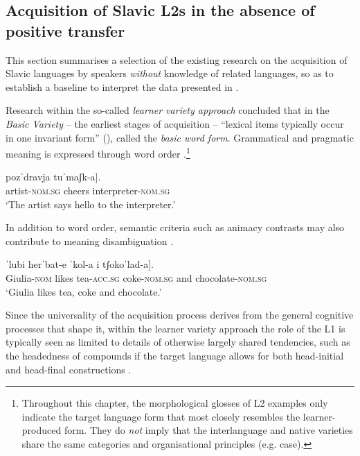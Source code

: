 \documentclass[output=paper,            colorlinks, citecolor=brown            		  ]{langscibook}
\begin{document}
\subsection{Acquisition of Slavic L2s in the absence of positive transfer}
\label{sec:saturno:2.3}
This section summarises a selection of the existing research on the acquisition of Slavic languages by speakers \textit{without} knowledge of related languages, so as to establish a baseline to interpret the data presented in .

Research within the so-called \textit{learner variety approach} \citep{Perdue1993book} concluded that in the \textit{Basic Variety} -- the earliest stages of acquisition -- “lexical items typically occur in one invariant form” (\citealt[311]{KleinPerdue1997}), called the \textit{basic word form}. Grammatical and pragmatic meaning is expressed through word order .\footnote{Throughout this chapter, the morphological glosses of L2 examples only indicate the target language form that most closely resembles the learner-produced form. They do {\textit{not}} imply that the interlanguage and native varieties share the same categories and organisational principles (e.g. case).}

\ea\label{ex:saturno:6}  
\gll {[Arˈtisk-a}     pozˈdravja   {tuˈmaʃk-a]}.\\
artist-\textsc{nom.sg}   cheers   interpreter-\textsc{nom.sg}\\ 
\glt ‘The artist says hello to the interpreter.’
\z

In addition to word order, semantic criteria such as animacy contrasts may also contribute to meaning disambiguation . 

\ea\label{ex:saturno:7}  
\gll {[ˈDʒulj-a}  ˈlubi   herˈbat-e  ˈkol-a     i   {tʃokoˈlad-a]}.\\
Giulia-\textsc{nom}   likes   tea-\textsc{acc.sg}  coke-\textsc{nom.sg}  and   chocolate-\textsc{nom.sg}\\ 
\glt ‘Giulia likes tea, coke and chocolate.’
\z

Since the universality of the acquisition process derives from the general cognitive processes that shape it, within the learner variety approach the role of the L1 is typically seen as limited to details of otherwise largely shared tendencies, such as the headedness of compounds if the target language allows for both head-initial and head-final constructions \citep{BroederEtAl1993}.
\end{document}
